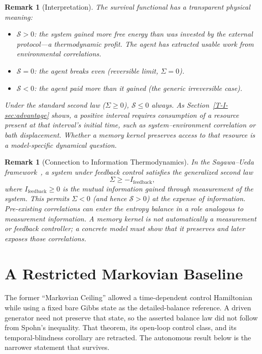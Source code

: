 \documentclass[12pt,a4paper,openany]{book}
\newtheorem{remark}[theorem]{Remark}
\begin{document}
\begin{remark}[Interpretation]
\label{T-I-rem:survival_interp}
The survival functional has a transparent physical meaning:
\begin{itemize}
\item $\mathcal{S} > 0$: the system gained more free energy than
  was invested by the external protocol---a \emph{thermodynamic
  profit}. The agent has extracted usable work from environmental
  correlations.
\item $\mathcal{S} = 0$: the agent breaks even (reversible limit,
  $\Sigma = 0$).
\item $\mathcal{S} < 0$: the agent paid more than it gained
  (the generic irreversible case).
\end{itemize}
Under the standard second law ($\Sigma \geq 0$),
$\mathcal{S} \leq 0$ always.
As Section~\ref{T-I-sec:advantage} shows, a positive interval requires
consumption of a resource present at that interval's initial time,
such as system--environment correlation or bath displacement.
Whether a memory kernel preserves access to that resource is a
model-specific dynamical question.
\end{remark}

\begin{remark}[Connection to Information Thermodynamics]
\label{T-I-rem:connection_SU}
In the Sagawa--Ueda framework~\cite{SagawaUeda2010,SagawaUeda2012},
a system under feedback control satisfies the generalized second law
\begin{equation}
\label{T-I-eq:sagawa_ueda}
\Sigma \geq -I_{\mathrm{feedback}},
\end{equation}
where $I_{\mathrm{feedback}} \geq 0$ is the mutual information
gained through measurement of the system.
This permits $\Sigma < 0$ (and hence $\mathcal{S} > 0$) at
the expense of information.
Pre-existing correlations can enter the entropy balance in a role
analogous to measurement information.  A memory kernel is not
automatically a measurement or feedback controller; a concrete model
must show that it preserves and later exposes those correlations.
\end{remark}

\section{A Restricted Markovian Baseline}
\label{T-I-sec:ceiling}

The former ``Markovian Ceiling'' allowed a time-dependent control
Hamiltonian while using a fixed bare Gibbs state as the
detailed-balance reference.  A driven generator need not preserve that
state, so the asserted balance law did not follow from Spohn's
inequality.  That theorem, its open-loop control class, and its
temporal-blindness corollary are retracted.  The autonomous result below
is the narrower statement that survives.
\end{document}
